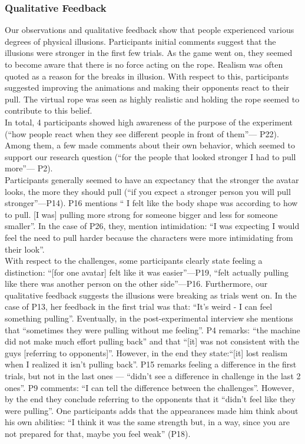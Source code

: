 \subsubsection{Qualitative Feedback}
\label{qualitativeFeedback}
Our observations and qualitative feedback show that people experienced various degrees of physical illusions. Participants initial comments suggest that the illusions were stronger in the first few trials. As the game went on, they seemed to become aware that there is no force acting on the rope. Realism was often quoted as a reason for the breaks in illusion. With respect to this, participants suggested improving the animations and making their opponents react to their pull. The virtual rope was seen as highly realistic and holding the rope seemed to contribute to this belief.
\\
 In total, 4 participants showed high awareness of the purpose of the experiment (``how people react when they see different people in front of them''--- P22). Among them, a few made comments about their own behavior, which seemed to support our research question (``for the people that looked stronger I had to pull more''--- P2). \\
Participants generally seemed to have an expectancy that the stronger the avatar looks, the more they should pull (``if you expect a stronger person you will pull stronger''---P14). P16 mentions `` I felt like the body shape was according to how to pull. [I was] pulling more strong for someone bigger and less for someone smaller''. In the case of P26, they, mention intimidation: ``I was expecting I would feel the need to pull harder because the characters were more intimidating from their look''.\\
With respect to the challenges, some participants clearly state feeling a distinction: ``[for one avatar] felt like it was easier''---P19, ``felt actually pulling like there was another person on the other side''---P16. Furthermore, our qualitative feedback suggests the illusions were breaking as trials went on. In the case of P13, her feedback in the first trial was that: ``It's weird - I can feel something pulling''. Eventually, in the post-experimental interview she mentions that ``sometimes they were pulling without me feeling''. P4 remarks: ``the machine did not make much effort pulling back'' and that ``[it] was not consistent with the guys [referring to opponents]''. However, in the end they state:``[it] lost realism when I realized it isn't pulling back''. P15 remarks feeling a difference in the first trials, but not in the last ones --- ``didn't see a difference in challenge in the last 2 ones''. P9 comments: ``I can tell the difference between the challenges''. However, by the end they conclude referring to the opponents that it ``didn't feel like they were pulling''. One participants adds that the appearances made him think about his own abilities: ``I think it was the same strength but, in a way, since you are not prepared for that, maybe you feel weak'' (P18).\\
